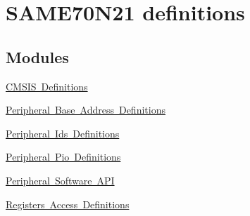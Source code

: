 \hypertarget{group__SAME70N21__definitions}{}\section{S\+A\+M\+E70\+N21 definitions}
\label{group__SAME70N21__definitions}
\subsection*{Modules}
\begin{DoxyCompactItemize}
\item 
\mbox{\hyperlink{group__SAME70N21__cmsis}{C\+M\+S\+I\+S Definitions}}
\item 
\mbox{\hyperlink{group__SAME70N21__base}{Peripheral Base Address Definitions}}
\item 
\mbox{\hyperlink{group__SAME70N21__id}{Peripheral Ids Definitions}}
\item 
\mbox{\hyperlink{group__SAME70N21__pio}{Peripheral Pio Definitions}}
\item 
\mbox{\hyperlink{group__SAME70N21__api}{Peripheral Software A\+PI}}
\item 
\mbox{\hyperlink{group__SAME70N21__reg}{Registers Access Definitions}}
\end{DoxyCompactItemize}
